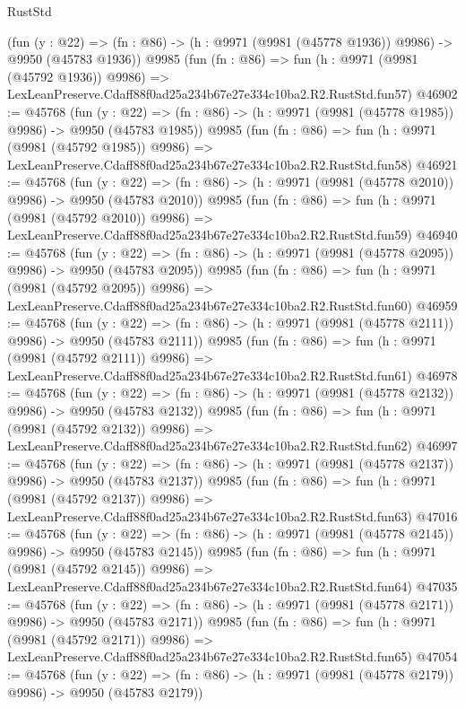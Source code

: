 \begin{lexlean}{RustStd}
\begin{coremodule}
    (fun (y : @22) =>
    (fn : @86) -> (h : @9971 (@9981 (@45778 @1936)) @9986) -> @9950 (@45783 @1936))
    @9985
    (fun (fn : @86) =>
    fun (h : @9971 (@9981 (@45792 @1936)) @9986) =>
    LexLeanPreserve.Cdaff88f0ad25a234b67e27e334c10ba2.R2.RustStd.fun57)
@46902 := @45768
    (fun (y : @22) =>
    (fn : @86) -> (h : @9971 (@9981 (@45778 @1985)) @9986) -> @9950 (@45783 @1985))
    @9985
    (fun (fn : @86) =>
    fun (h : @9971 (@9981 (@45792 @1985)) @9986) =>
    LexLeanPreserve.Cdaff88f0ad25a234b67e27e334c10ba2.R2.RustStd.fun58)
@46921 := @45768
    (fun (y : @22) =>
    (fn : @86) -> (h : @9971 (@9981 (@45778 @2010)) @9986) -> @9950 (@45783 @2010))
    @9985
    (fun (fn : @86) =>
    fun (h : @9971 (@9981 (@45792 @2010)) @9986) =>
    LexLeanPreserve.Cdaff88f0ad25a234b67e27e334c10ba2.R2.RustStd.fun59)
@46940 := @45768
    (fun (y : @22) =>
    (fn : @86) -> (h : @9971 (@9981 (@45778 @2095)) @9986) -> @9950 (@45783 @2095))
    @9985
    (fun (fn : @86) =>
    fun (h : @9971 (@9981 (@45792 @2095)) @9986) =>
    LexLeanPreserve.Cdaff88f0ad25a234b67e27e334c10ba2.R2.RustStd.fun60)
@46959 := @45768
    (fun (y : @22) =>
    (fn : @86) -> (h : @9971 (@9981 (@45778 @2111)) @9986) -> @9950 (@45783 @2111))
    @9985
    (fun (fn : @86) =>
    fun (h : @9971 (@9981 (@45792 @2111)) @9986) =>
    LexLeanPreserve.Cdaff88f0ad25a234b67e27e334c10ba2.R2.RustStd.fun61)
@46978 := @45768
    (fun (y : @22) =>
    (fn : @86) -> (h : @9971 (@9981 (@45778 @2132)) @9986) -> @9950 (@45783 @2132))
    @9985
    (fun (fn : @86) =>
    fun (h : @9971 (@9981 (@45792 @2132)) @9986) =>
    LexLeanPreserve.Cdaff88f0ad25a234b67e27e334c10ba2.R2.RustStd.fun62)
@46997 := @45768
    (fun (y : @22) =>
    (fn : @86) -> (h : @9971 (@9981 (@45778 @2137)) @9986) -> @9950 (@45783 @2137))
    @9985
    (fun (fn : @86) =>
    fun (h : @9971 (@9981 (@45792 @2137)) @9986) =>
    LexLeanPreserve.Cdaff88f0ad25a234b67e27e334c10ba2.R2.RustStd.fun63)
@47016 := @45768
    (fun (y : @22) =>
    (fn : @86) -> (h : @9971 (@9981 (@45778 @2145)) @9986) -> @9950 (@45783 @2145))
    @9985
    (fun (fn : @86) =>
    fun (h : @9971 (@9981 (@45792 @2145)) @9986) =>
    LexLeanPreserve.Cdaff88f0ad25a234b67e27e334c10ba2.R2.RustStd.fun64)
@47035 := @45768
    (fun (y : @22) =>
    (fn : @86) -> (h : @9971 (@9981 (@45778 @2171)) @9986) -> @9950 (@45783 @2171))
    @9985
    (fun (fn : @86) =>
    fun (h : @9971 (@9981 (@45792 @2171)) @9986) =>
    LexLeanPreserve.Cdaff88f0ad25a234b67e27e334c10ba2.R2.RustStd.fun65)
@47054 := @45768
    (fun (y : @22) =>
    (fn : @86) -> (h : @9971 (@9981 (@45778 @2179)) @9986) -> @9950 (@45783 @2179))

\end{coremodule}
\end{lexlean}

